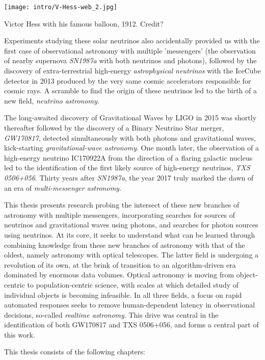 \begin{marginfigure}
	\centering \texttt{[image: intro/V-Hess-web\_2.jpg]}
	\caption{Victor Hess with his famous balloon, 1912. Credit?}
\end{marginfigure}

Experiments studying these solar neutrinos also accidentally provided us with the first case of observational astronomy with multiple 'messengers' (the observation of nearby supernova \emph{SN1987a} with both neutrinos and photons), followed by the discovery of extra-terrestrial high-energy \emph{astrophysical neutrinos} with the IceCube detector in 2013 produced by the very same cosmic accelerators responsible for cosmic rays. A scramble to find the origin of these neutrinos led to the birth of a new field, \emph{neutrino astronomy}. 

The long-awaited discovery of Gravitational Waves by LIGO in 2015 was shortly thereafter followed by the discovery of a Binary Neutrino Star merger, \emph{GW170817}, detected simultaneously with both photons and gravitational waves, kick-starting \emph{gravitational-wave astronomy}. One month later, the observation of a high-energy neutrino IC170922A from the direction of a flaring galactic nucleus led to the identification of the first likely source of high-energy neutrinos, \emph{TXS 0506+056}. Thirty years after \emph{SN1987a}, the year 2017 truly marked the dawn of an era of \emph{multi-messenger astronomy}. 

This thesis presents research probing the intersect of these new branches of astronomy with multiple messengers, incorporating searches for sources of neutrinos and gravitational waves using photons, and searches for photon sources using neutrinos. At its core, it seeks to understand what can be learned through combining knowledge from these new branches of astronomy with that of the oldest, namely astronomy with optical telescopes. The latter field is undergoing a revolution of its own, at the brink of transition to an algorithm-driven era dominated by enormous data volumes. Optical astronomy is moving from object-centric to population-centric science, with scales at which detailed study of individual objects is becoming infeasible. In all three fields, a focus on rapid automated responses seeks to remove human-dependent latency in observational decisions, so-called \emph{realtime astronomy}. This drive was central in the identification of both GW170817 and TXS 0506+056, and forms a central part of this work.

This thesis consists of the following chapters:

